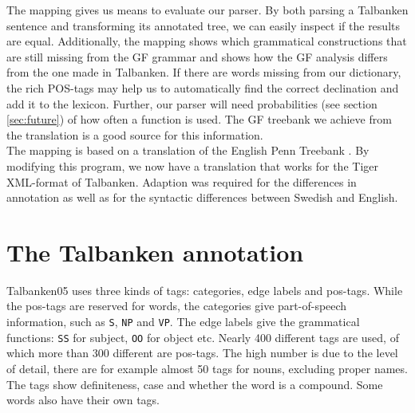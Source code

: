 \documentclass{report}
\begin{document}
The mapping %
gives us means to evaluate our parser. By both parsing a Talbanken sentence and
transforming its annotated tree, we can easily inspect if the results are
equal.
Additionally, the mapping shows which grammatical constructions that are still missing
from the GF grammar and shows how the GF analysis differs from the one made
in Talbanken.
If there are words missing from our dictionary, the rich
POS-tags may help us to automatically find the correct declination and add it to the
lexicon. Further, our parser will need probabilities (see section
\ref{sec:future}) of how often a function is used. The GF treebank we
achieve from the translation is a good source for this information.\\

The mapping is based on 
a translation of the English Penn Treebank \cite{gfpenn}.
By modifying this program, we now have a translation that works for
the Tiger XML-format of
Talbanken. Adaption was required for the differences in annotation as well as 
for the syntactic differences between Swedish and English.

\section{The Talbanken annotation}
Talbanken05 uses three kinds of tags: categories, edge labels and pos-tags. 
While the pos-tags are reserved for words, the categories give part-of-speech information,
such as \verb|S|, \verb|NP| and \verb|VP|.
The edge labels give the grammatical functions: \verb|SS| for subject, 
\verb|OO| for object etc. Nearly 400 different tags are used, of which more than
300 different are pos-tags. The high number is due to the level of detail,  there are for
example almost 50 tags for nouns, excluding proper names. The tags
show definiteness, case and whether the word is a compound. Some words also have
their own tags.\\
\end{document}
